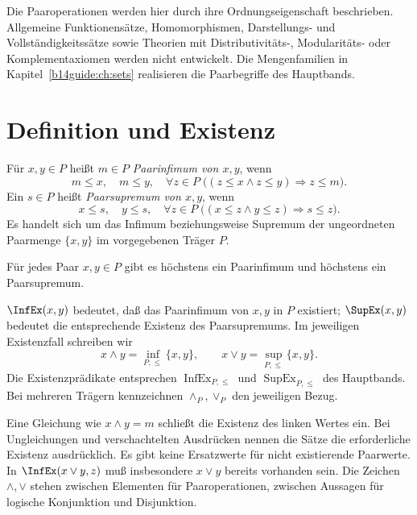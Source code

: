 Die Paaroperationen werden hier durch ihre Ordnungseigenschaft
beschrieben. Allgemeine Funktionensätze, Homomorphismen,
Darstellungs- und Vollständigkeitssätze sowie Theorien mit
Distributivitäts-, Modularitäts- oder Komplementaxiomen werden
nicht entwickelt. Die Mengenfamilien in Kapitel~\ref{b14guide:ch:sets}
realisieren die Paarbegriffe des Hauptbands.

\section{Definition und Existenz}

\begin{definition}
\label{b14guide:def:pair}
Für $x,y\in P$ heißt $m\in P$ \emph{Paarinfimum von $x,y$}, wenn
\[
 m\leq x,\quad m\leq y,\quad
 \forall z\in P\;\bigl((z\leq x\land z\leq y)\Rightarrow z\leq m\bigr).
\]
Ein $s\in P$ heißt \emph{Paarsupremum von $x,y$}, wenn
\[
 x\leq s,\quad y\leq s,\quad
 \forall z\in P\;\bigl((x\leq z\land y\leq z)\Rightarrow s\leq z\bigr).
\]
Es handelt sich um das Infimum beziehungsweise Supremum der
ungeordneten Paarmenge $\{x,y\}$ im vorgegebenen Träger $P$.
\end{definition}

\begin{theorem}
\label{b14guide:thm:unique}
Für jedes Paar $x,y\in P$ gibt es höchstens ein Paarinfimum und
höchstens ein Paarsupremum.
\end{theorem}

\begin{definition}
\label{b14guide:def:existence}
$\InfEx(x,y)$ bedeutet, daß das Paarinfimum von $x,y$ in $P$
existiert; $\SupEx(x,y)$ bedeutet die entsprechende Existenz
des Paarsupremums. Im jeweiligen Existenzfall schreiben wir
\[
 x\wedge y=\inf_{P,\leq}\{x,y\},\qquad
 x\vee y=\sup_{P,\leq}\{x,y\}.
\]
Die Existenzprädikate entsprechen
$\operatorname{InfEx}_{P,\leq}$ und $\operatorname{SupEx}_{P,\leq}$
des Hauptbands. Bei mehreren Trägern kennzeichnen
$\wedge_P,\vee_P$ den jeweiligen Bezug.
\end{definition}

Eine Gleichung wie $x\wedge y=m$ schließt die Existenz des
linken Wertes ein. Bei Ungleichungen und verschachtelten
Ausdrücken nennen die Sätze die erforderliche Existenz ausdrücklich.
Es gibt keine Ersatzwerte für nicht existierende Paarwerte.
In $\InfEx(x\vee y,z)$ muß insbesondere $x\vee y$ bereits
vorhanden sein. Die Zeichen $\wedge,\vee$ stehen zwischen
Elementen für Paaroperationen, zwischen Aussagen für
logische Konjunktion und Disjunktion.